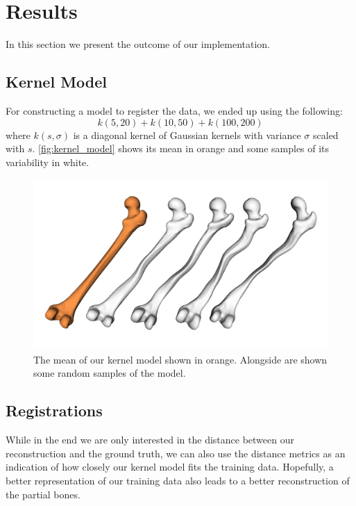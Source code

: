 \section{Results}
\label{sec:results}

In this section we present the outcome of our implementation.


\subsection{Kernel Model}
\label{subsec:kernmodel}

For constructing a model to register the data, we ended up using the following: 
$$ k(5, 20) + k(10, 50) + k(100, 200) $$
where $k(s, \sigma)$ is a diagonal kernel of Gaussian kernels with variance $\sigma$ scaled with $s$. 
\autoref{fig:kernel_model} shows its mean in orange and some samples of its variability in white.

\begin{figure}
	\centering
  \includegraphics[width=\columnwidth]{./Figures/kernel_model_samples}
  \caption{
    The mean of our kernel model shown in orange. 
    Alongside are shown some random samples of the model.}
  \label{fig:kernel_model}
\end{figure}


\subsection{Registrations}
\label{subsec:registrresults}
While in the end we are only interested in the distance between our reconstruction and the ground truth, we can also use the distance metrics as an indication of how closely our kernel model fits the training data. 
Hopefully, a better representation of our training data also leads to a better reconstruction of the partial bones. 

